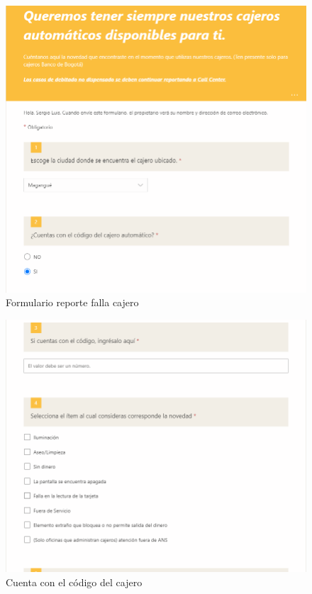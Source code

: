 \begin{figure}[H]
	\centering
	\includegraphics[scale=0.3]{Capitulo3/imagenes/f1.png}
	\caption{Formulario reporte falla cajero}
	\label{fig:FreporteFalla}
\end{figure}
\begin{figure}[H]
	\centering
	\includegraphics[scale=0.3]{Capitulo3/imagenes/f2.png}
	\caption{Cuenta con el código del cajero}
	\label{fig:CuentaCodigoDelCajero}
\end{figure}
